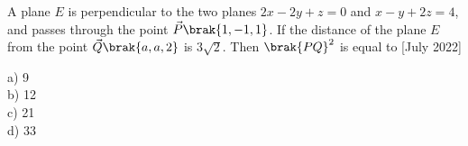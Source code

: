 \item A plane $E$ is perpendicular to the two planes $2x-2y+z=0$ and $x-y+2z=4$, and passes through the point $\vec{P}\brak{1,-1,1}$. If the distance of the plane $E$ from the point $\vec{Q}\brak{a,a,2}$ is $3\sqrt{2}$. Then $\brak{PQ}^2$ is equal to \hfill{[July 2022]}
\begin{multicols}{4}
    a) 9\\
    b) 12\\
    c) 21\\
    d) 33
\end{multicols}
%

